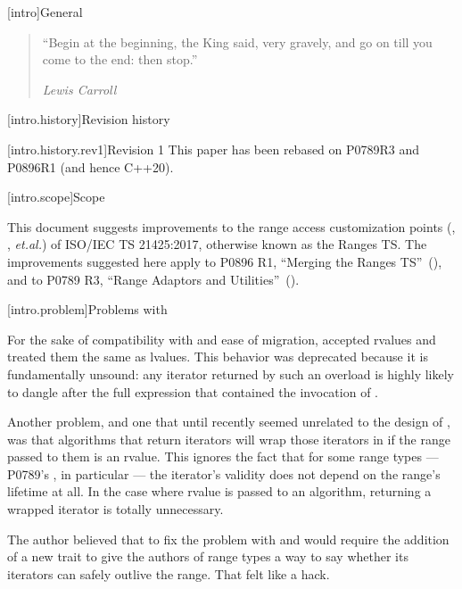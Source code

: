 [intro]{General}

\begin{quote}
``Begin at the beginning, the King said, very gravely, and go on till you come to the end: then stop.''
\begin{flushright}
\textemdash \textit{Lewis Carroll}
\end{flushright}
\end{quote}

\begin{addedblock}
[intro.history]{Revision history}

[intro.history.rev1]{Revision 1}
This paper has been rebased on P0789R3 and P0896R1 (and hence C++20).
\end{addedblock}

[intro.scope]{Scope}

\pnum
This document suggests improvements to the range access customization points
(, , \textit{et.al.}) of ISO/IEC TS 21425:2017, otherwise
known as the Ranges TS. The improvements suggested here apply to P0896 R1,
``Merging the Ranges TS''~(\cite{P0896}), and to P0789 R3, ``Range Adaptors and
Utilities''~(\cite{P0789}).

[intro.problem]{Problems with }

\pnum
For the sake of compatibility with  and ease of migration,
 accepted rvalues and treated them the
same as  lvalues. This behavior was deprecated because it is
fundamentally unsound: any iterator returned by such an overload is highly
likely to dangle after the full expression that contained the invocation of
.

\pnum
Another problem, and one that until recently seemed unrelated to the design of
, was that algorithms that return iterators will wrap those
iterators in  if the range passed
to them is an rvalue. This ignores the fact that for some range types ---
 P0789's ,
in particular --- the iterator's validity does not
depend on the range's lifetime at all. In the case where rvalue
 is passed to an algorithm,
returning a wrapped iterator is totally unnecessary.

\pnum
The author believed that to fix the problem with  and
 would require the addition of a new trait to give the authors
of range types a way to say whether its iterators can safely outlive the range.
That felt like a hack.

